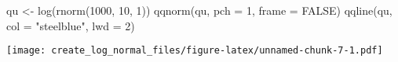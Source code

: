\documentclass[
]{article}
\newenvironment{Shaded}{\begin{snugshade}}{\end{snugshade}}
\newcommand{\AttributeTok}[1]{\textcolor[rgb]{0.77,0.63,0.00}{#1}}
\newcommand{\ConstantTok}[1]{\textcolor[rgb]{0.00,0.00,0.00}{#1}}
\newcommand{\DecValTok}[1]{\textcolor[rgb]{0.00,0.00,0.81}{#1}}
\newcommand{\FunctionTok}[1]{\textcolor[rgb]{0.00,0.00,0.00}{#1}}
\newcommand{\NormalTok}[1]{#1}
\newcommand{\OtherTok}[1]{\textcolor[rgb]{0.56,0.35,0.01}{#1}}
\newcommand{\StringTok}[1]{\textcolor[rgb]{0.31,0.60,0.02}{#1}}
\begin{document}
\begin{Shaded}
\begin{Highlighting}[]
\NormalTok{qu }\OtherTok{\textless{}{-}} \FunctionTok{log}\NormalTok{(}\FunctionTok{rnorm}\NormalTok{(}\DecValTok{1000}\NormalTok{, }\DecValTok{10}\NormalTok{, }\DecValTok{1}\NormalTok{))}
\FunctionTok{qqnorm}\NormalTok{(qu, }\AttributeTok{pch =} \DecValTok{1}\NormalTok{, }\AttributeTok{frame =} \ConstantTok{FALSE}\NormalTok{)}
\FunctionTok{qqline}\NormalTok{(qu, }\AttributeTok{col =} \StringTok{"steelblue"}\NormalTok{, }\AttributeTok{lwd =} \DecValTok{2}\NormalTok{)}
\end{Highlighting}
\end{Shaded}

\texttt{[image: create\_log\_normal\_files/figure-latex/unnamed-chunk-7-1.pdf]}
\end{document}
